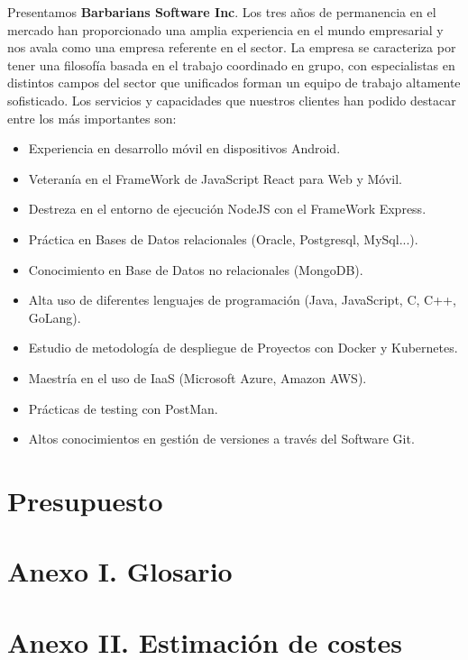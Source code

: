 \documentclass{article}
\begin{document}
Presentamos \textbf{Barbarians Software Inc}. Los tres años de permanencia en el mercado han proporcionado una amplia experiencia en el mundo empresarial y nos avala como una empresa referente en el sector. La empresa se caracteriza por tener una filosofía basada en el trabajo coordinado en grupo, con especialistas en distintos campos del sector que unificados forman un equipo de trabajo altamente sofisticado.
Los servicios y capacidades que nuestros clientes han podido destacar entre los más importantes son:
\begin{itemize}
   \item Experiencia en desarrollo móvil en dispositivos Android.
   \item Veteranía en el FrameWork de JavaScript React para Web y Móvil.
   \item Destreza en el entorno de ejecución NodeJS con el FrameWork Express.
   \item Práctica en Bases de Datos relacionales (Oracle, Postgresql, MySql...).
   \item Conocimiento en Base de Datos no relacionales (MongoDB).
   \item Alta uso de diferentes lenguajes de programación (Java, JavaScript, C, C++, GoLang).
   \item Estudio de metodología de despliegue de Proyectos con Docker y Kubernetes.
   \item Maestría en el uso de IaaS (Microsoft Azure, Amazon AWS).
   \item Prácticas de testing con PostMan.
   \item Altos conocimientos en gestión de versiones a través del Software Git.
\end{itemize}

\section{Presupuesto}

\section*{Anexo I. Glosario}

\section*{Anexo II. Estimación de costes}

\end{document}
